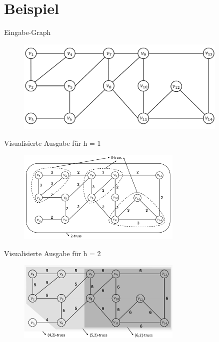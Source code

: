 \section*{Beispiel}

\begin{frame}{Eingabe-Graph}
    \begin{figure}[h]
        \centering
        \includegraphics[width=0.9\textwidth]{imglib/Example-Graph-Initial}\\
        \label{fig:example-graph-initial}
    \end{figure}
\end{frame}

\begin{frame}{Visualisierte Ausgabe für h = 1}
    \begin{figure}[h]
        \centering
        \includegraphics[width=0.7\textwidth]{imglib/Example-Graph-Solution-1}\\
        \label{fig:example-graph-solution-1}
    \end{figure}
\end{frame}

\begin{frame}{Visualisierte Ausgabe für h = 2}
    \begin{figure}[h]
        \centering
        \includegraphics[width=0.7\textwidth]{imglib/Example-Graph-Solution-2}\\
        \label{fig:example-graph-solution-2}
    \end{figure}
\end{frame}